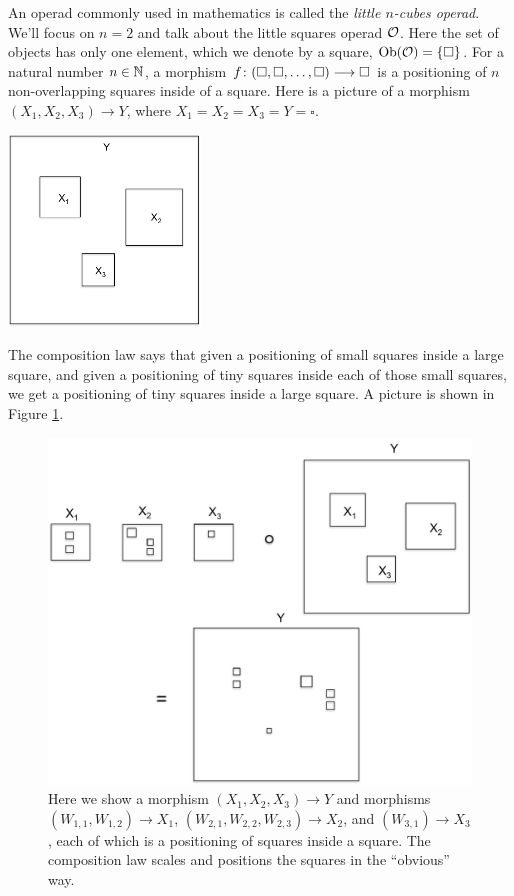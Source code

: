 \documentclass[CT4S-EN-RU]{subfiles}
\begin{document}
\begin{example}\label{ex:little squares}

An operad commonly used in mathematics is called the {\em little $n$-cubes operad}. We'll focus on $n=2$ and talk about the little squares operad $\mathcal{O}$. Here the set of objects has only one element, which we denote by a square, $\textnormal{Ob}(\mathcal{O})=\{\square\}$. For a natural number $n\in{\mathbb N}$, a morphism $f\colon(\square,\square,\ldots,\square)\longrightarrow\square$ is a positioning of $n$ non-overlapping squares inside of a square. Here is a picture of a morphism $(X_1,X_2,X_3)\to Y$, where $X_1=X_2=X_3=Y=\square$.
\begin{center}
\includegraphics[height=2in]{square1}
\end{center}
The composition law says that given a positioning of small squares inside a large square, and given a positioning of tiny squares inside each of those small squares, we get a positioning of tiny squares inside a large square. A picture is shown in Figure \ref{fig:composition law for squares}.
\begin{figure}[H]
\begin{center}
\includegraphics[width=\textwidth]{square2}
\end{center}
\caption{Here we show a morphism $(X_1,X_2,X_3)\to Y$ and morphisms $(W_{1,1},W_{1,2})\to X_1$, $(W_{2,1},W_{2,2},W_{2,3})\to X_2$, and $(W_{3,1})\to X_3$, each of which is a positioning of squares inside a square. The composition law scales and positions the squares in the “obvious” way.}
\label{fig:composition law for squares}
\end{figure}


\end{example}
\end{document}
